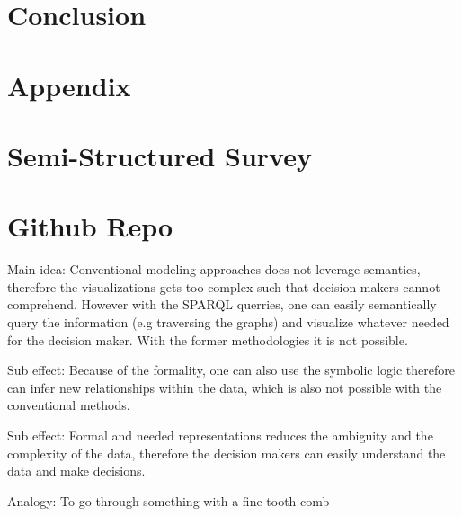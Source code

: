 \documentclass[runningheads]{llncs}
\begin{document}
\section{Conclusion}

\section{Appendix}
\appendix
\section{Semi-Structured Survey}
%
\section{Github Repo}




Main idea: Conventional modeling approaches does not leverage semantics, therefore the visualizations gets too complex such that decision makers cannot comprehend.
However with the SPARQL querries, one can easily semantically query the information (e.g traversing the graphs) and visualize whatever needed for the decision maker. With the former 
methodologies it is not possible.

Sub effect: Because of the formality, one can also use the symbolic logic therefore can infer new relationships within the data, which is also not possible with the conventional methods.


Sub effect: Formal and needed representations reduces the ambiguity and the complexity of the data, therefore the decision makers can easily understand the data and make decisions.

Analogy: To go through something with a fine-tooth comb 
\end{document}
